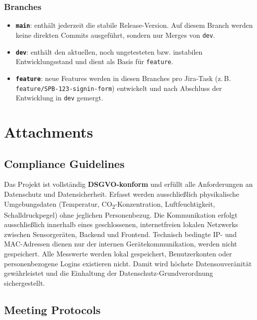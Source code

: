 \documentclass{article}
\newcommand{\branch}[1]{\texttt{#1}}
\begin{document}
\subsubsection{Branches}
\begin{itemize}
  \item \textbf{\branch{main}}: enthält jederzeit die stabile Release-Version. Auf diesem Branch werden keine direkten Commits ausgeführt, sondern nur Merges von \branch{dev}.
  \item \textbf{\branch{dev}}: enthält den aktuellen, noch ungetesteten bzw. instabilen Entwicklungsstand und dient als Basis für \branch{feature}.
  \item \textbf{\branch{feature}}: neue Features werden in diesen Branches pro Jira-Task (z.\,B. \texttt{feature/SPB-123-signin-form}) entwickelt und nach Abschluss der Entwicklung in \branch{dev} gemergt.
\end{itemize}











\section{Attachments}
\subsection{Compliance Guidelines}

Das Projekt ist vollständig \textbf{DSGVO-konform} und erfüllt alle Anforderungen an Datenschutz und Datensicherheit. 
Erfasst werden ausschließlich physikalische Umgebungsdaten (Temperatur, CO\textsubscript{2}-Konzentration, Luftfeuchtigkeit, Schalldruckpegel) ohne jeglichen Personenbezug. 
Die Kommunikation erfolgt ausschließlich innerhalb eines geschlossenen, internetfreien lokalen Netzwerks zwischen Sensorgeräten, Backend und Frontend. 
Technisch bedingte IP- und MAC-Adressen dienen nur der internen Gerätekommunikation, werden nicht gespeichert. 
Alle Messwerte werden lokal gespeichert, Benutzerkonten oder personenbezogene Logins existieren nicht. 
Damit wird höchste Datensouveränität gewährleistet und die Einhaltung der Datenschutz-Grundverordnung sichergestellt.






\subsection{Meeting Protocols}
\end{document}
